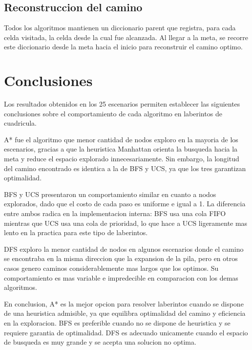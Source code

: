 \documentclass[12pt]{article}
\begin{document}
\subsection{Reconstruccion del camino}

Todos los algoritmos mantienen un diccionario parent que registra, para cada celda visitada, la celda desde la cual fue alcanzada. Al llegar a la meta, se recorre este diccionario desde la meta hacia el inicio para reconstruir el camino optimo.

\section{Conclusiones}

Los resultados obtenidos en los 25 escenarios permiten establecer las siguientes conclusiones sobre el comportamiento de cada algoritmo en laberintos de cuadricula.

A* fue el algoritmo que menor cantidad de nodos exploro en la mayoria de los escenarios, gracias a que la heuristica Manhattan orienta la busqueda hacia la meta y reduce el espacio explorado innecesariamente. Sin embargo, la longitud del camino encontrado es identica a la de BFS y UCS, ya que los tres garantizan optimalidad.

BFS y UCS presentaron un comportamiento similar en cuanto a nodos explorados, dado que el costo de cada paso es uniforme e igual a 1. La diferencia entre ambos radica en la implementacion interna: BFS usa una cola FIFO mientras que UCS usa una cola de prioridad, lo que hace a UCS ligeramente mas lento en la practica para este tipo de laberintos.

DFS exploro la menor cantidad de nodos en algunos escenarios donde el camino se encontraba en la misma direccion que la expansion de la pila, pero en otros casos genero caminos considerablemente mas largos que los optimos. Su comportamiento es mas variable e impredecible en comparacion con los demas algoritmos.

En conclusion, A* es la mejor opcion para resolver laberintos cuando se dispone de una heuristica admisible, ya que equilibra optimalidad del camino y eficiencia en la exploracion. BFS es preferible cuando no se dispone de heuristica y se requiere garantia de optimalidad. DFS es adecuado unicamente cuando el espacio de busqueda es muy grande y se acepta una solucion no optima.
\end{document}
